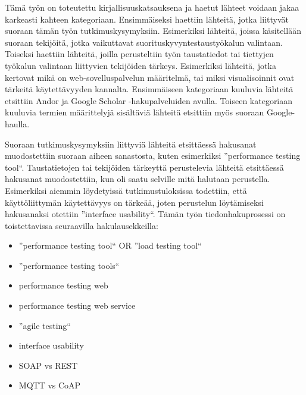 
Tämä työn on toteutettu kirjallisuuskatsauksena ja haetut lähteet voidaan jakaa karkeasti kahteen kategoriaan. Ensimmäiseksi haettiin lähteitä, jotka liittyvät suoraan tämän työn tutkimuskysymyksiin. Esimerkiksi lähteitä, joissa käsitellään suoraan tekijöitä, jotka vaikuttavat suorituskyvyntestaustyökalun valintaan. Toiseksi haettiin lähteitä, joilla perusteltiin työn taustatiedot tai tiettyjen työkalun valintaan liittyvien tekijöiden tärkeys. Esimerkiksi lähteitä, jotka kertovat mikä on \gls{web-sovelluspalvelu}n määritelmä, tai miksi visualisoinnit ovat tärkeitä käytettävyyden kannalta. Ensimmäiseen kategoriaan kuuluvia lähteitä etsittiin Andor ja Google Scholar -hakupalveluiden avulla. Toiseen kategoriaan kuuluvia termien määrittelyjä sisältäviä lähteitä etsittiin myös suoraan Google-haulla.

Suoraan tutkimuskysymyksiin liittyviä lähteitä etsittäessä hakusanat muodostettiin suoraan aiheen sanastosta, kuten esimerkiksi ''performance testing tool``. Taustatietojen tai tekijöiden tärkeyttä perustelevia lähteitä etsittäessä hakusanat muodostettiin, kun oli saatu selville mitä halutaan perustella. Esimerkiksi aiemmin löydetyissä tutkimustuloksissa todettiin, että käyttöliittymän käytettävyys on tärkeää, joten perustelun löytämiseksi hakusanaksi otettiin ''interface usability``. Tämän työn tiedonhakuprosessi on toistettavissa seuraavilla hakulausekkeilla:
\begin{itemize}
    \item ''performance testing tool`` OR ''load testing tool``
    \item ''performance testing tools``
    \item performance testing web
    \item performance testing web service
    \item ''agile testing``
    \item interface usability
    \item SOAP vs REST
    \item MQTT vs CoAP
\end{itemize}

